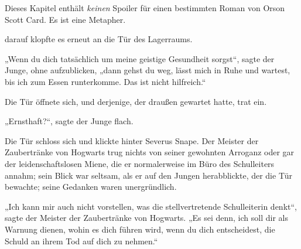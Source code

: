 
\begin{chapterOpeningAuthorNote}
Dieses Kapitel enthält \emph{keinen} Spoiler für einen bestimmten Roman von Orson Scott Card. Es ist eine Metapher.
\end{chapterOpeningAuthorNote}

 darauf klopfte es erneut an die Tür des Lagerraums.

\hplettrineextrapara
„Wenn du dich tatsächlich um meine geistige Gesundheit sorgst“, sagte der Junge, ohne aufzublicken, „dann gehst du weg, lässt mich in Ruhe und wartest, bis ich zum Essen runterkomme. Das ist nicht hilfreich.“

Die Tür öffnete sich, und derjenige, der draußen gewartet hatte, trat ein.

„Ernsthaft?“, sagte der Junge flach.


Die Tür schloss sich und klickte hinter Severus Snape. Der Meister der Zaubertränke von Hogwarts trug nichts von seiner gewohnten Arroganz oder gar der leidenschaftslosen Miene, die er normalerweise im Büro des Schulleiters annahm; sein Blick war seltsam, als er auf den Jungen herabblickte, der die Tür bewachte; seine Gedanken waren unergründlich.

„Ich kann mir auch nicht vorstellen, was die stellvertretende Schulleiterin denkt“, sagte der Meister der Zaubertränke von Hogwarts. „Es sei denn, ich soll dir als Warnung dienen, wohin es dich führen wird, wenn du dich entscheidest, die Schuld an ihrem Tod auf dich zu nehmen.“

